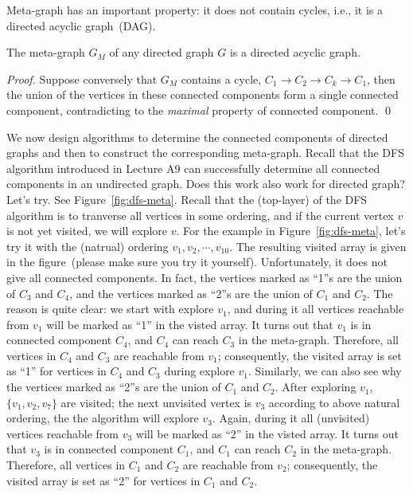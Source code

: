 Meta-graph has an important property: it does not contain cycles, i.e., it is a directed acyclic graph~(DAG).

\begin{claim}
The meta-graph $G_M$ of any directed graph $G$ is a directed acyclic graph.
\end{claim}

\emph{Proof.} Suppose conversely that $G_M$ contains a cycle, $C_1 \to C_2 \to C_k \to C_1$,
then the union of the vertices in these connected components form a single connected component,
contradicting to the \emph{maximal} property of connected component. \qed

We now design algorithms to determine the connected components of directed graphs and then to construct
the corresponding meta-graph.
Recall that the DFS algorithm introduced in Lecture A9 can successfully determine all connected components in an undirected graph.
Does this work also work for directed graph? Let's try. See Figure~\ref{fig:dfs-meta}.
Recall that the (top-layer) of the DFS algorithm is to tranverse all vertices in some ordering,
and if the current vertex $v$ is not yet visited, we will explore $v$.
For the example in Figure~\ref{fig:dfs-meta}, let's try it with the (natrual) ordering $v_1, v_2, \cdots, v_{10}$.
The resulting visited array is given in the figure~(please make sure you try it yourself).
Unfortunately, it does not give all connected components. In fact, the vertices marked as ``1''s are the union of $C_3$ and $C_4$,
and the vertices marked as ``2''s are the union of $C_1$ and $C_2$.
The reason is quite clear: we start with explore $v_1$, and during it all vertices reachable from $v_1$ will be marked as ``1'' in the visted array.
It turns out that $v_1$ is in connected component $C_4$, and $C_4$ can reach $C_3$ in the meta-graph.
Therefore, all vertices in $C_4$ and $C_3$ are reachable from $v_1$; consequently, the visited array is set as ``1'' for 
vertices in $C_4$ and $C_3$ during explore $v_1$. 
Similarly, we can also see why the vertices marked as ``2''s are the union of $C_1$ and $C_2$.
After exploring $v_1$, $\{v_1,v_2,v_7\}$ are visited; the next unvisited vertex is $v_3$ according to above natural ordering,
the the algorithm will explore $v_3$.
Again, during it all (unvisited) vertices reachable from $v_3$ will be marked as ``2'' in the visted array.
It turns out that $v_3$ is in connected component $C_1$, and $C_1$ can reach $C_2$ in the meta-graph.
Therefore, all vertices in $C_1$ and $C_2$ are reachable from $v_2$;
consequently, the visited array is set as ``2'' for 
vertices in $C_1$ and $C_2$. 



